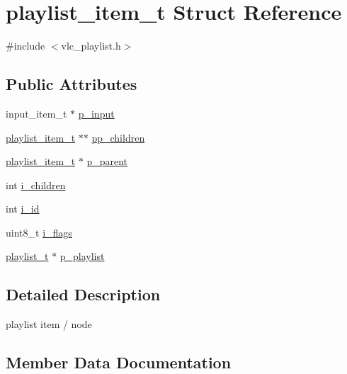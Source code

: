 \hypertarget{structplaylist__item__t}{}\section{playlist\+\_\+item\+\_\+t Struct Reference}
\label{structplaylist__item__t}


{\ttfamily \#include $<$vlc\+\_\+playlist.\+h$>$}

\subsection*{Public Attributes}
\begin{DoxyCompactItemize}
\item 
input\+\_\+item\+\_\+t $\ast$ \hyperlink{structplaylist__item__t_a5424e765011e62b50d107300f92b0d39}{p\+\_\+input}
\item 
\hyperlink{structplaylist__item__t}{playlist\+\_\+item\+\_\+t} $\ast$$\ast$ \hyperlink{structplaylist__item__t_a5ef0b5fca43e022ac56e00fd7a57a5e0}{pp\+\_\+children}
\item 
\hyperlink{structplaylist__item__t}{playlist\+\_\+item\+\_\+t} $\ast$ \hyperlink{structplaylist__item__t_a4c5183597d06e0467dbf3526a6777a9a}{p\+\_\+parent}
\item 
int \hyperlink{structplaylist__item__t_a2d5e2d909e2829bf805d99352348e80c}{i\+\_\+children}
\item 
int \hyperlink{structplaylist__item__t_ab906400e779343ae82c41ca39ede90ce}{i\+\_\+id}
\item 
uint8\+\_\+t \hyperlink{structplaylist__item__t_ab0b9d31ca92b7c1eaccb9f9ec4528a19}{i\+\_\+flags}
\item 
\hyperlink{structplaylist__t}{playlist\+\_\+t} $\ast$ \hyperlink{structplaylist__item__t_a4723dfc8cd6ad6d775c56ffcb93174c2}{p\+\_\+playlist}
\end{DoxyCompactItemize}


\subsection{Detailed Description}
playlist item / node 

\subsection{Member Data Documentation}
\mbox{\label{structplaylist__item__t_a2d5e2d909e2829bf805d99352348e80c}} 
